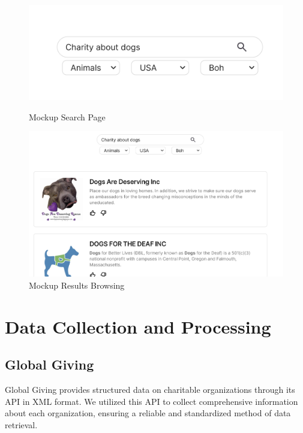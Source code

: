 \documentclass[unicode,9pt,a4paper,oneside,numbers=endperiod,openany]{scrartcl}
\begin{document}
\begin{figure}[h]
    \centering
    \begin{minipage}{0.45\textwidth}
        \centering
        \includegraphics[width=\textwidth]{fig/mockup1.png}
        \caption{Mockup Search Page}
    \end{minipage}\hfill
    \begin{minipage}{0.45\textwidth}
        \centering
        \includegraphics[width=\textwidth]{fig/mockup2.png}
        \caption{Mockup Results Browsing}
    \end{minipage}
\end{figure}

\section{Data Collection and Processing}

\subsection{Global Giving}
Global Giving provides structured data on charitable organizations through its API in XML format. We utilized this API to collect comprehensive information about each organization, ensuring a reliable and standardized method of data retrieval.
\end{document}
